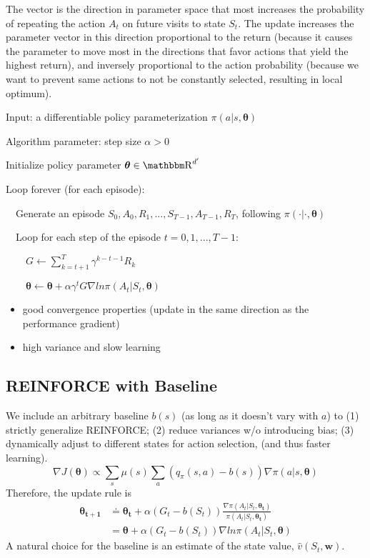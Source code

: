 \documentclass[sutton_barto_notes.tex]{subfiles}
\begin{document}
The vector is the direction in parameter space that most increases the probability of repeating the action $A_t$ on future visits to state $S_t$. The update increases the parameter vector in this direction proportional to the return (because it causes the parameter to move most in the directions that favor actions that yield the highest return), and inversely proportional to the action probability (because we want to prevent same actions to not be constantly selected, resulting in local optimum).

\begin{tcolorbox}[width=1.1\textwidth,title={REINFORCE: Monte-Carlo Policy-Gradient Control (episodic) for $\pi_*$}]
Input: a differentiable policy parameterization $\pi(a|s,\bm{\theta})$

Algorithm parameter: step size $\alpha > 0$

Initialize policy parameter $\bm{\theta} \in \R^{d'}$

Loop forever (for each episode):

$\quad$Generate an episode $S_0,A_0,R_1,...,S_{T-1},A_{T-1},R_T$, following $\pi(\cdot|\cdot,\bm{\theta})$

$\quad$Loop for each step of the episode $t=0,1,...,T-1$:

$\quad\quad G\leftarrow\sum_{k=t+1}^T \gamma^{k-t-1}R_k$

$\quad\quad\bm{\theta}\leftarrow\bm{\theta}+\alpha\gamma^t G \nabla ln\pi(A_t | S_t, \bm{\theta})$
\end{tcolorbox}

\begin{itemize}
\item good convergence properties (update in the same direction as the performance gradient)
\item high variance and slow learning
\end{itemize}

\subsection{REINFORCE with Baseline}

We include an arbitrary baseline $b(s)$ (as long as it doesn't vary with $a$) to (1) strictly generalize REINFORCE; (2) reduce variances w/o introducing bias; (3) dynamically adjust to different states for action selection, (and thus faster learning).
$$\nabla J(\bm{\theta}) \propto \sum_s\mu(s)\sum_a (q_\pi(s,a) - b(s))\nabla\pi(a|s,\bm{\theta})$$
Therefore, the update rule is
\begin{align*}
\bm{\theta_{t+1}} &\doteq \bm{\theta_t} + \alpha (G_t - b(S_t)) \frac{\nabla\pi(A_t|S_t,\bm{\theta_t})}{\pi(A_t|S_t,\bm{\theta_t})} \\
&= \bm{\theta} + \alpha (G_t - b(S_t)) \nabla ln \pi(A_t|S_t, \bm{\theta})
\end{align*}
A natural choice for the baseline is an estimate of the state value, $\hat{v}(S_t, \bm{w})$.
\end{document}
